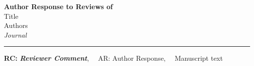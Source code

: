 \providecommand{\lettertitle}{Author Response to Reviews of}
\providecommand{\papertitle}{Title}
\providecommand{\authors}{Authors}
\providecommand{\journal}{Journal}
\providecommand{\doi}{--}





{\Large\bf \lettertitle}\\[1em]
{\huge \papertitle}\\[1em]
{\authors}\\
{\it \journal }
\hrule

\hfill {\bfseries \color{gray}RC:} \textbf{\color{gray}\textit{Reviewer Comment}},\(\quad\) AR: Author Response,\(\quad\) \vrule width 3pt \hspace{5pt} {\selectfont Manuscript text}

\renewcommand\thefigure{R\arabic{figure}}
\renewcommand{\theequation}{R\arabic{equation}}
\renewcommand{\thetable}{R\arabic{table}} 
\renewcommand\thelstlisting{R\arabic{lstlisting}}
\renewcommand\thesubsection{Q\arabic{section}.\arabic{subsection}}